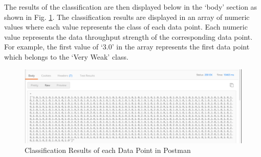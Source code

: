  The results of the classification are then displayed below in the `body' section as shown in Fig. \ref{fig_postr}. The classification results are displayed in an array of numeric values where each value represents the class of each data point. Each numeric value represents the data throughput strength of the corresponding data point. For example, the first value of `3.0' in the array represents the first data point which belongs to the `Very Weak' class.
 
 \begin{figure} [ht]
    \centering
    \includegraphics[scale=0.56]{pages/Chapter5/Chapter 5 images/PostmanR.PNG}
    \caption{Classification Results of each Data Point in Postman}
    \label{fig_postr}
\end{figure}